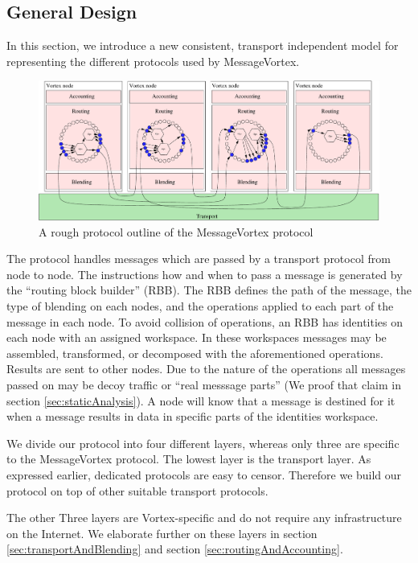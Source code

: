 \documentclass[10pt,journal,compsoc]{IEEEtran}
\let\MYoriglatexcaption\caption
\renewcommand{\caption}[2][\relax]{\MYoriglatexcaption[#2]{#2}}
\begin{document}
\subsection{General Design}
In this section, we introduce a new consistent, transport independent model for representing the different protocols used by MessageVortex.

\begin{figure}[ht!]
	\centering\includegraphics[width=\columnwidth]{../../inc/roughProtocolDesign.pdf}
	\caption{A rough protocol outline of the MessageVortex protocol}\label{fig:protocolOutline}
\end{figure}

The protocol handles messages which are passed by a transport protocol from node to node. The instructions how and when to pass a message is generated by the ``routing block builder'' (RBB). The RBB defines the path of the message, the type of blending on each nodes, and the operations applied to each part of the message in each node. To avoid collision of operations, an RBB has identities on each node with an assigned workspace. In these workspaces messages may be assembled, transformed, or decomposed with the aforementioned operations. Results are sent to other nodes. Due to the nature of the operations all messages passed on may be decoy traffic or ``real messsage parts'' (We proof that claim in section \ref{sec:staticAnalysis}). A node will know that a message is destined for it when a message results in data in specific parts of the identities workspace.

We divide our protocol into four different layers, whereas only three are specific to the MessageVortex protocol. The lowest layer is the transport layer. As expressed earlier, dedicated protocols are easy to censor. Therefore we build our protocol on top of other suitable transport protocols. 

The other Three layers are Vortex-specific and do not require any infrastructure on the Internet. We elaborate further on these layers in section \ref{sec:transportAndBlending} and section \ref{sec:routingAndAccounting}.
\end{document}
